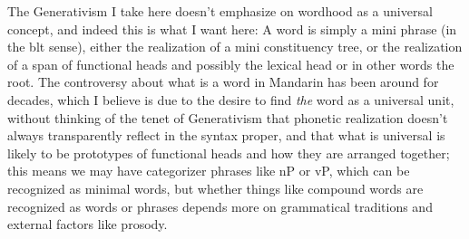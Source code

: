 \documentclass[UTF8, a4paper, oneside, scheme=plain, 12pt]{ctexrep}
\begin{document}
{The Generativism I take here doesn't emphasize on wordhood as a universal concept,
and indeed this is what I want here:
A word is simply a mini phrase (in the \acs{blt} sense),
either the realization of a mini constituency tree,
or the realization of a span of functional heads 
and possibly the lexical head or in other words the root.
The controversy about what is a word in Mandarin 
has been around for decades,
which I believe is due to the desire to 
find \emph{the} word as a universal unit,
without thinking of the tenet of Generativism 
that phonetic realization doesn't always 
transparently reflect in the syntax proper,
and that what is universal is likely to be 
prototypes of functional heads and how they are arranged together;
this means we may have categorizer phrases like nP or vP,
which can be recognized as minimal words,
but whether things like compound words are recognized as words or phrases 
depends more on grammatical traditions
and external factors like prosody.

}
\end{document}
